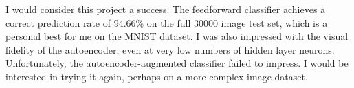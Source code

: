 \documentclass[english]{tktltiki}
\begin{document}
I would consider this project a success.  The feedforward classifier achieves a correct prediction rate of 94.66\% on the full 30000 image test set, which is a personal best for me on the MNIST dataset.  I was also impressed with the visual fidelity of the autoencoder, even at very low numbers of hidden layer neurons.  Unfortunately, the autoencoder-augmented classifier failed to impress.  I would be interested in trying it again, perhaps on a more complex image dataset.  

\pagebreak

\nocite{*}



\lastpage
\end{document}
